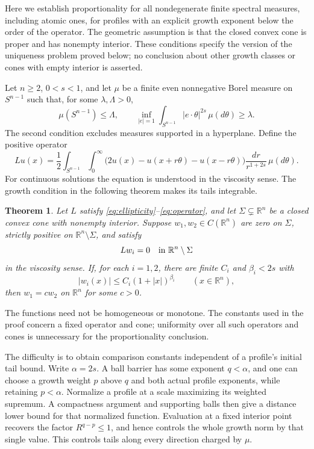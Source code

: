 \documentclass[11pt]{article}
\newtheorem{theorem}{Theorem}[section]
\numberwithin{equation}{section}
\newcommand{\R}{\mathbb R}
\begin{document}
Here we establish proportionality for all nondegenerate finite spectral
measures, including atomic ones, for profiles with an explicit growth
exponent below the order of the operator. The geometric assumption is that
the closed convex cone is proper and has nonempty interior. These conditions
specify the version of the uniqueness problem proved below; no conclusion
about other growth classes or cones with empty interior is asserted.

Let \(n\ge2\), \(0<s<1\), and let \(\mu\) be a finite even nonnegative
Borel measure on \(S^{n-1}\) such that, for some \(\lambda,\Lambda>0\),
\begin{equation}\label{eq:ellipticity}
 \mu(S^{n-1})\le\Lambda,\qquad
 \inf_{|e|=1}\int_{S^{n-1}}|e\cdot\theta|^{2s}\,\mu(d\theta)
       \ge\lambda.
\end{equation}
The second condition excludes measures supported in a hyperplane. Define
the positive operator
\begin{equation}\label{eq:operator}
 Lu(x)=\frac12\int_{S^{n-1}}\int_0^\infty
 \bigl(2u(x)-u(x+r\theta)-u(x-r\theta)\bigr)
 \frac{dr}{r^{1+2s}}\,\mu(d\theta).
\end{equation}
For continuous solutions the equation is understood in the viscosity sense.
The growth condition in the following theorem makes its tails integrable.

\begin{theorem}\label{thm:main}
Let \(L\) satisfy \eqref{eq:ellipticity}--\eqref{eq:operator}, and let
\(\Sigma\subsetneq\R^n\) be a closed convex cone with nonempty interior.
Suppose \(w_1,w_2\in C(\R^n)\) are zero on \(\Sigma\), strictly positive
on \(\R^n\setminus\Sigma\), and satisfy
\[
 Lw_i=0\quad\hbox{in }\R^n\setminus\Sigma
\]
in the viscosity sense. If, for each \(i=1,2\), there are finite \(C_i\)
and \(\beta_i<2s\) with
\[
 |w_i(x)|\le C_i(1+|x|)^{\beta_i}\qquad(x\in\R^n),
\]
then \(w_1=cw_2\) on \(\R^n\) for some \(c>0\).
\end{theorem}

The functions need not be homogeneous or monotone. The constants used in
the proof concern a fixed operator and cone; uniformity over all such
operators and cones is unnecessary for the proportionality conclusion.

The difficulty is to obtain comparison constants independent of a profile's
initial tail bound. Write \(\alpha=2s\). A ball barrier has some exponent
\(q<\alpha\), and one can choose a growth weight \(p\) above \(q\) and
both actual profile exponents, while retaining \(p<\alpha\).
Normalize a profile at a scale maximizing its weighted supremum. A compactness
argument and supporting balls then give a distance lower bound for that
normalized function. Evaluation at a fixed interior point recovers the
factor \(R^{q-p}\le1\), and hence controls the whole growth norm by that
single value. This controls tails along every direction charged by \(\mu\).
\end{document}
